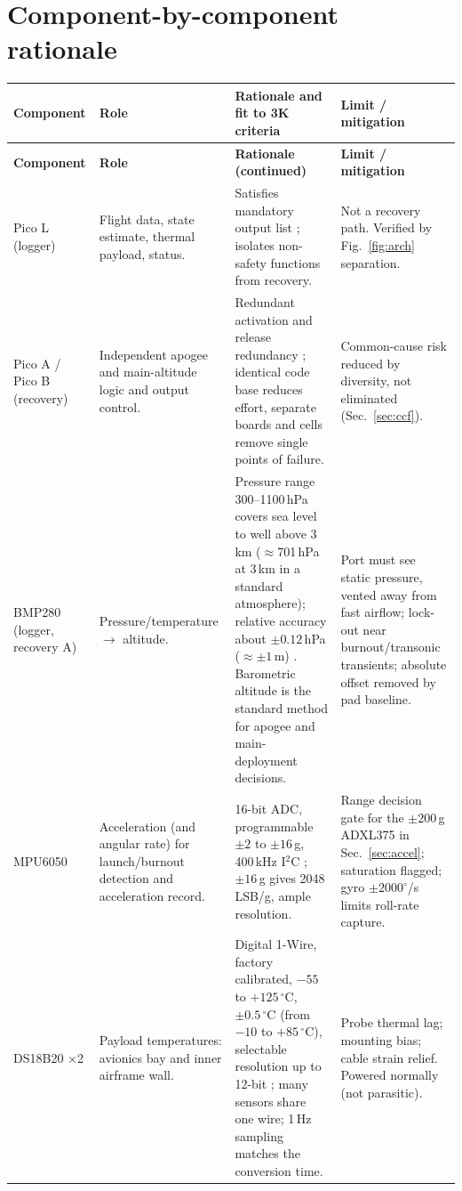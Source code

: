 \section{Component-by-component rationale}
\small
{}
\begin{longtable}{@{}L{23mm}L{30mm}L{60mm}L{37mm}@{}}
\toprule{}\textbf{Component}&\textbf{Role}&\textbf{Rationale and fit to 3K criteria}&\textbf{Limit / mitigation}\\\midrule\endfirsthead
\toprule{}\textbf{Component}&\textbf{Role}&\textbf{Rationale (continued)}&\textbf{Limit / mitigation}\\\midrule\endhead
\bottomrule\endlastfoot
Pico L (logger) & Flight data, state estimate, thermal payload, status. & Satisfies mandatory output list \cite{rtc2027app03}; isolates non-safety functions from recovery. & Not a recovery path. Verified by Fig.~\ref{fig:arch} separation.\\
Pico A / Pico B (recovery) & Independent apogee and main-altitude logic and output control. & Redundant activation and release redundancy \cite{rtc2027app03}; identical code base reduces effort, separate boards and cells remove single points of failure. & Common-cause risk reduced by diversity, not eliminated (Sec.~\ref{sec:ccf}).\\
BMP280 (logger, recovery A) & Pressure/temperature $\rightarrow$ altitude. & Pressure range 300--1100\,hPa covers sea level to well above 3\,km ($\approx$701\,hPa at 3\,km in a standard atmosphere); relative accuracy about $\pm0.12$\,hPa ($\approx\pm1$\,m) \cite{bmp280ds}. Barometric altitude is the standard method for apogee and main-deployment decisions. & Port must see static pressure, vented away from fast airflow; lock-out near burnout/transonic transients; absolute offset removed by pad baseline.\\
MPU6050 & Acceleration (and angular rate) for launch/burnout detection and acceleration record. & 16-bit ADC, programmable $\pm2$ to $\pm16$\,g, 400\,kHz I$^2$C \cite{mpu6050ds,i2cspec}; $\pm16$\,g gives 2048\,LSB/g, ample resolution. & Range decision gate for the $\pm200$\,g ADXL375 \cite{adxl375ds} in Sec.~\ref{sec:accel}; saturation flagged; gyro $\pm2000^{\circ}$/s limits roll-rate capture.\\
DS18B20 $\times$2 & Payload temperatures: avionics bay and inner airframe wall. & Digital 1-Wire, factory calibrated, $-55$ to $+125\,^{\circ}$C, $\pm0.5\,^{\circ}$C (from $-10$ to $+85\,^{\circ}$C), selectable resolution up to 12-bit \cite{ds18b20ds}; many sensors share one wire; 1\,Hz sampling matches the conversion time. & Probe thermal lag; mounting bias; cable strain relief. Powered normally (not parasitic).\\

\end{longtable}
